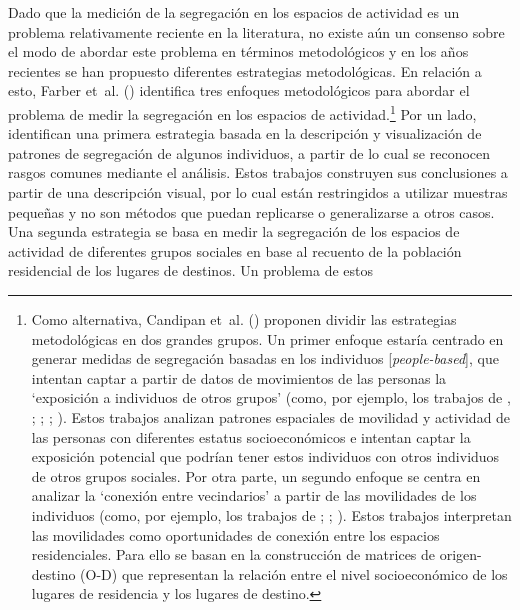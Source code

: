 \documentclass[
  spanish,
  a4paper,%
  chapterprefix=true,%
  DIV=calc,%
  twoside]{scrbook}%
\begin{document}
Dado que la medición de la segregación en los espacios de actividad es
un problema relativamente reciente en la literatura, no existe aún un
consenso sobre el modo de abordar este problema en términos
metodológicos y en los años recientes se han propuesto diferentes
estrategias metodológicas. En relación a esto, Farber et~al. () identifica
tres enfoques metodológicos para abordar el problema de medir la
segregación en los espacios de actividad.\footnote{Como alternativa, Candipan et~al. ()
  proponen dividir las estrategias metodológicas en dos grandes
  grupos. Un primer enfoque estaría centrado en generar medidas de
  segregación basadas en los individuos {[}\emph{people-based}{]}, que intentan
  captar a partir de datos de movimientos de las personas la
  `exposición a individuos de otros grupos' (como, por ejemplo, los
  trabajos de , ; ; ; ). Estos trabajos analizan patrones espaciales de movilidad
  y actividad de las personas con diferentes estatus socioeconómicos e
  intentan captar la exposición potencial que podrían tener estos
  individuos con otros individuos de otros grupos sociales.
  Por
  otra parte, un segundo enfoque se centra en analizar la `conexión
  entre vecindarios' a partir de las movilidades de los individuos
  (como, por ejemplo, los trabajos de ; ; ). Estos trabajos interpretan las movilidades como
  oportunidades de conexión entre los espacios residenciales. Para
  ello se basan en la construcción de matrices de origen-destino (O-D)
  que representan la relación entre el nivel socioeconómico de los
  lugares de residencia y los lugares de
  destino.}
Por un lado, identifican una primera estrategia basada en la descripción
y visualización de patrones de segregación de algunos individuos, a
partir de lo cual se reconocen rasgos comunes mediante el análisis.
Estos trabajos construyen sus conclusiones a partir de una descripción
visual, por lo cual están restringidos a utilizar muestras pequeñas y no
son métodos que puedan replicarse o generalizarse a otros casos. Una
segunda estrategia se basa en medir la segregación de los espacios de
actividad de diferentes grupos sociales en base al recuento de la
población residencial de los lugares de destinos. Un problema de estos
\end{document}
